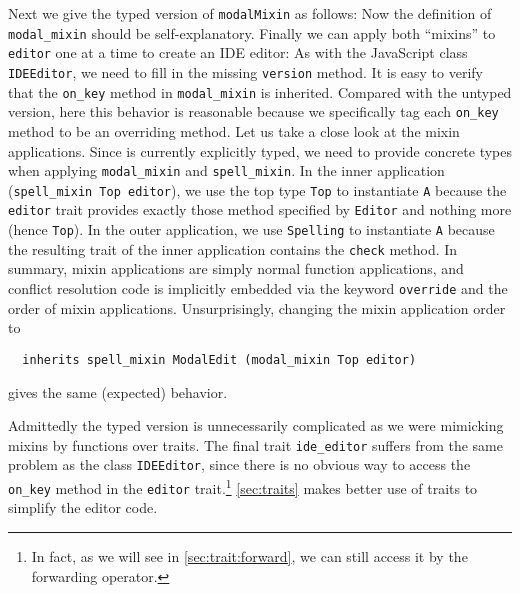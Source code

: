 Next we give the typed version of \lstinline{modalMixin} as follows:
Now the definition of \lstinline{modal_mixin} should be self-explanatory.
Finally we can apply both ``mixins'' to \lstinline{editor} one at a time to create
an IDE editor:
As with the JavaScript class \lstinline{IDEEditor}, we need to fill in the missing
\lstinline{version} method. It is easy to verify that the \lstinline{on_key} method
in \lstinline{modal_mixin} is inherited. Compared with the untyped version,
here this behavior is reasonable because we specifically tag each
\lstinline{on_key} method to be an overriding method. Let us take a close look
at the mixin applications. Since \sedel is currently explicitly typed, we need to
provide concrete types when applying \lstinline{modal_mixin} and \lstinline{spell_mixin}.
In the inner application (\lstinline{spell_mixin Top editor}), we use the top
type \lstinline{Top} to instantiate \lstinline{A} because the \lstinline{editor} trait
provides exactly those method specified by \lstinline{Editor} and nothing more
(hence \lstinline{Top}). In the outer application, we use \lstinline{Spelling}
to instantiate \lstinline{A} because the resulting trait of the inner application
contains the \lstinline{check} method.
In summary, mixin applications are simply normal function applications,
and conflict resolution code is implicitly embedded via the keyword \lstinline{override}
and the order of mixin applications.
Unsurprisingly, changing the mixin application order to
\begin{lstlisting}
  inherits spell_mixin ModalEdit (modal_mixin Top editor)
\end{lstlisting}
gives the same (expected) behavior.


Admittedly the typed version is unnecessarily complicated as we were
mimicking mixins by functions over traits. The final trait
\lstinline{ide_editor} suffers from the same problem as the class
\lstinline{IDEEditor}, since there is no obvious way to access the
\lstinline{on_key} method in the \lstinline{editor} trait.\footnote{In fact, as
  we will see in \cref{sec:trait:forward}, we can still access it by the forwarding operator.} \cref{sec:traits}
makes better use of traits to simplify the editor code.




